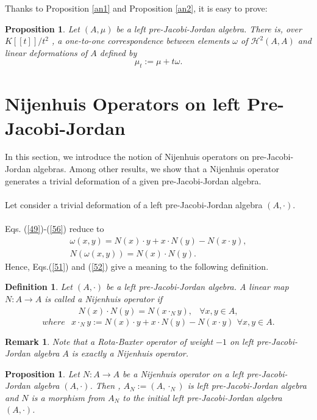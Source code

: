 \documentclass[12pt]{amsart}
\newtheorem{definition}[Theorem]{Definition}
\newtheorem{remark}[Theorem]{Remark}
\newtheorem{proposition}[Theorem]{Proposition}
\begin{document}
Thanks to Proposition \ref{an1} and Proposition \ref{an2}, it is easy to prove:
\begin{proposition}
Let $ (A,\mu) $ be a left pre-Jacobi-Jordan algebra. There is, over $K[[t]]/t^2$ , a one-to-one
correspondence between elements $\omega$ of $\mathcal{H}^2(A,A)$ and linear deformations of $A$ defined by 
$$\mu_t:=\mu +t\omega.$$
\end{proposition}
	\section{Nijenhuis Operators on left Pre-Jacobi-Jordan}
	In this section, we introduce the notion of Nijenhuis operators on pre-Jacobi-Jordan algebras. Among other results, we show that a Nijenhuis operator  generates a trivial deformation of a given pre-Jacobi-Jordan 
	algebra.\\
	\\
	Let  consider a trivial deformation of a left pre-Jacobi-Jordan algebra $ (A,\cdot) $.\\\\
	Eqs. (\ref{49})-(\ref{56}) reduce to 
	\begin{eqnarray}
		\label{51}
		\omega(x,y)=N(x)\cdot y+x\cdot N(y)-N(x\cdot y),\\
		\label{52}
		N(\omega(x,y))=N(x)\cdot N(y).
	\end{eqnarray}
	Hence, Eqs.(\ref{51}) and (\ref{52}) give a meaning to the following definition.
	\begin{definition}\label{D13}
		Let $ (A,\cdot) $ be a left pre-Jacobi-Jordan algebra. A linear map $ N : A\to A $ is called a Nijenhuis operator if 
		\begin{eqnarray}
			\label{47}
			N(x)\cdot N(y)=N( x\cdot_N y),&\forall x,y\in A,
		\end{eqnarray}
		$$ where\,\,\,\
		x\cdot_N y:=N(x)\cdot y+x\cdot N(y)-N(x\cdot y)\,\ \forall x,y\in A.$$
	\end{definition}
	\begin{remark}
		Note that a Rota-Baxter operator of weight $-1$ on left pre-Jacobi-Jordan algebra $ A $ is exactly a Nijenhuis operator.
	\end{remark}
\begin{proposition}\label{pJJN}
	Let $ N : A\to A $ be a Nijenhuis operator on a left pre-Jacobi-Jordan algebra $ (A,\cdot) $. Then , $A_N:=(A,\cdot_{N})$ is left pre-Jacobi-Jordan algebra and  $ N $ is a morphism from  $ A_N $ to the initial left pre-Jacobi-Jordan algebra $ (A,\cdot) $.  	
\end{proposition}
\end{document}
